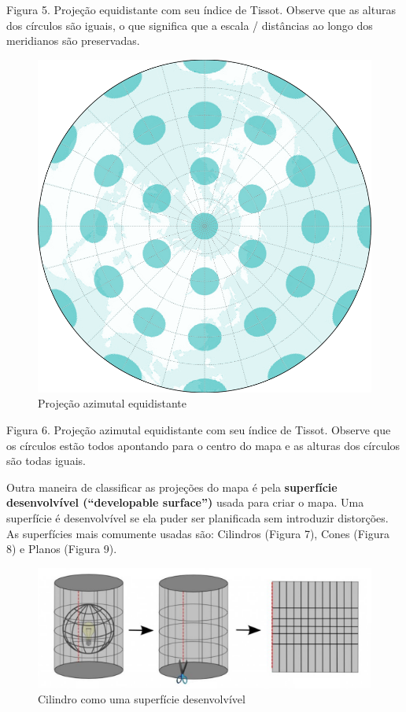 \documentclass[
]{book}
\begin{document}
Figura 5. Projeção equidistante com seu índice de Tissot. Observe que as alturas dos círculos são iguais, o que significa que a escala / distâncias ao longo dos meridianos são preservadas.

\begin{figure}
\centering
\includegraphics{media/modulo0/az-equidistant.png}
\caption{Projeção azimutal equidistante}
\end{figure}

Figura 6. Projeção azimutal equidistante com seu índice de Tissot. Observe que os círculos estão todos apontando para o centro do mapa e as alturas dos círculos são todas iguais.

Outra maneira de classificar as projeções do mapa é pela \textbf{superfície desenvolvível (``developable surface'')} usada para criar o mapa. Uma superfície é desenvolvível se ela puder ser planificada sem introduzir distorções. As superfícies mais comumente usadas são: Cilindros (Figura 7), Cones (Figura 8) e Planos (Figura 9).

\begin{figure}
\centering
\includegraphics{media/modulo0/cylinder.png}
\caption{Cilindro como uma superfície desenvolvível}
\end{figure}
\end{document}
